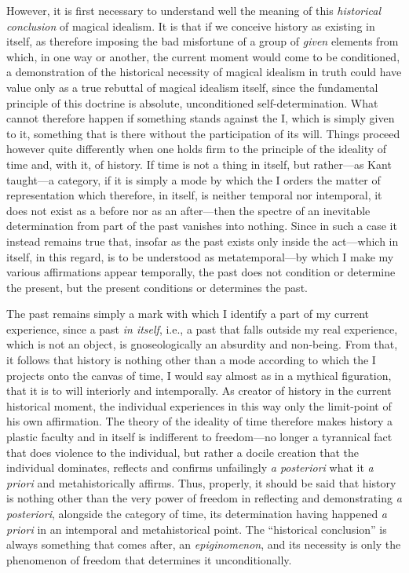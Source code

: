 However, it is first necessary to understand well the meaning of this \emph{historical conclusion} of magical idealism. It is that if we conceive history as existing in itself, as therefore imposing the bad misfortune of a group of \emph{given} elements from which, in one way or another, the current moment would come to be conditioned, a demonstration of the historical necessity of magical idealism in truth could have value only as a true rebuttal of magical idealism itself, since the fundamental principle of this doctrine is absolute, unconditioned self-determination. What cannot therefore happen if something stands against the I, which is simply given to it, something that is there without the participation of its will. Things proceed however quite differently when one holds firm to the principle of the ideality of time and, with it, of history. If time is not a thing in itself, but rather---as Kant taught---a category, if it is simply a mode by which the I orders the matter of representation which therefore, in itself, is neither temporal nor intemporal, it does not exist as a before nor as an after---then the spectre of an inevitable determination from part of the past vanishes into nothing. Since in such a case it instead remains true that, insofar as the past exists only inside the act---which in itself, in this regard, is to be understood as metatemporal---by which I make my various affirmations appear temporally, the past does not condition or determine the present, but the present conditions or determines the past.

The past remains simply a mark with which I identify a part of my current experience, since a past \emph{in itself}, i.e., a past that falls outside my real experience, which is not an object, is gnoseologically an absurdity and non-being. From that, it follows that history is nothing other than a mode according to which the I projects onto the canvas of time, I would say almost as in a mythical figuration, that it is to will interiorly and intemporally. As creator of history in the current historical moment, the individual experiences in this way only the limit-point of his own affirmation. The theory of the ideality of time therefore makes history a plastic faculty and in itself is indifferent to freedom---no longer a tyrannical fact that does violence to the individual, but rather a docile creation that the individual dominates, reflects and confirms unfailingly \emph{a posteriori} what it \emph{a priori} and metahistorically affirms. Thus, properly, it should be said that history is nothing other than the very power of freedom in reflecting and demonstrating \emph{a posteriori}, alongside the category of time, its determination having happened \emph{a priori} in an intemporal and metahistorical point. The ``historical conclusion'' is always something that comes after, an \emph{epiginomenon}, and its necessity is only the phenomenon of freedom that determines it unconditionally.

